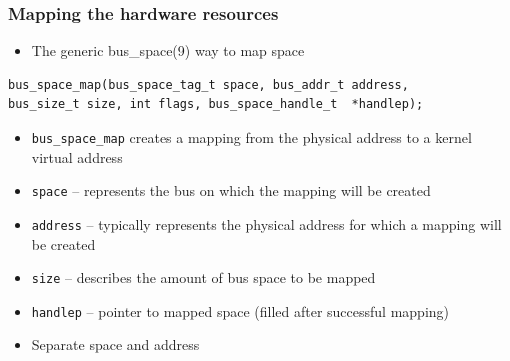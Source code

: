 \documentclass[dvipsnames,table]{beamer}
\begin{document}
\begin{frame}[fragile]
\frametitle{Mapping the hardware resources}

\begin{itemize}
	\item The generic bus\_space(9) way to map space
\end{itemize}

\begin{verbatim}
bus_space_map(bus_space_tag_t space, bus_addr_t address, 
bus_size_t size, int flags, bus_space_handle_t  *handlep);
\end{verbatim}

\begin{itemize}
	\item {\tt bus\_space\_map} creates a mapping from the physical address to a kernel virtual address
    \item {\tt space} -- represents the bus on which the mapping will be created
    \item {\tt address} -- typically represents the physical address for which a mapping will be created
	\item {\tt size} -- describes the amount of bus space to be mapped
	\item {\tt handlep} -- pointer to mapped space (filled after successful mapping)
    \item Separate space and address
\end{itemize}
\end{frame}
\end{document}
